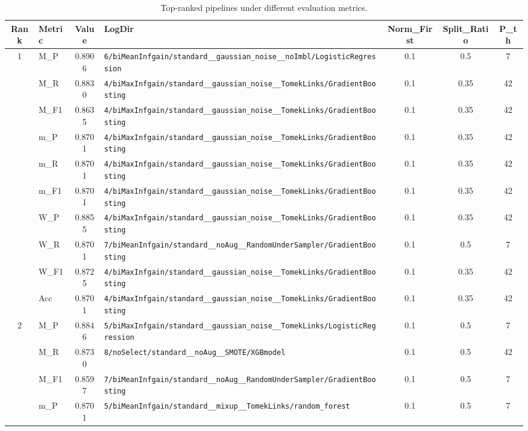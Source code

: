 \begin{table}[htbp]
\caption{Top-ranked pipelines under different evaluation metrics.}
\label{tab:rank_metric_vertical}
\centering
\small
\setlength{\tabcolsep}{4pt}
\begin{tabular}{|c|l|c|>{\ttfamily\footnotesize}p{7.2cm}|c|c|c|}
\hline
Rank & Metric & Value & LogDir & Norm\_First & Split\_Ratio & P\_th \\
\hline
\multirow{10}{*}{1} & M\_P & 0.8906 & \texttt{6/biMeanInfgain/standard\_\_gaussian\_noise\_\_noImbl/LogisticRegression} & 0.1 & 0.5  & 7 \\ 
 & M\_R & 0.8830 & \texttt{4/biMaxInfgain/standard\_\_gaussian\_noise\_\_TomekLinks/GradientBoosting} & 0.1 & 0.35  & 42 \\ 
 & M\_F1 & 0.8635 & \texttt{4/biMaxInfgain/standard\_\_gaussian\_noise\_\_TomekLinks/GradientBoosting} & 0.1 & 0.35  & 42 \\ 
 & m\_P & 0.8701 & \texttt{4/biMaxInfgain/standard\_\_gaussian\_noise\_\_TomekLinks/GradientBoosting} & 0.1 & 0.35  & 42 \\ 
 & m\_R & 0.8701 & \texttt{4/biMaxInfgain/standard\_\_gaussian\_noise\_\_TomekLinks/GradientBoosting} & 0.1 & 0.35  & 42 \\ 
 & m\_F1 & 0.8701 & \texttt{4/biMaxInfgain/standard\_\_gaussian\_noise\_\_TomekLinks/GradientBoosting} & 0.1 & 0.35  & 42 \\ 
 & W\_P & 0.8855 & \texttt{4/biMaxInfgain/standard\_\_gaussian\_noise\_\_TomekLinks/GradientBoosting} & 0.1 & 0.35  & 42 \\ 
 & W\_R & 0.8701 & \texttt{7/biMeanInfgain/standard\_\_noAug\_\_RandomUnderSampler/GradientBoosting} & 0.1 & 0.5  & 7 \\ 
 & W\_F1 & 0.8725 & \texttt{4/biMaxInfgain/standard\_\_gaussian\_noise\_\_TomekLinks/GradientBoosting} & 0.1 & 0.35  & 42 \\ 
 & Acc & 0.8701 & \texttt{4/biMaxInfgain/standard\_\_gaussian\_noise\_\_TomekLinks/GradientBoosting} & 0.1 & 0.35  & 42 \\ 
\hline
\multirow{10}{*}{2} & M\_P & 0.8846 & \texttt{5/biMaxInfgain/standard\_\_gaussian\_noise\_\_TomekLinks/LogisticRegression} & 0.1 & 0.5  & 7 \\ 
 & M\_R & 0.8730 & \texttt{8/noSelect/standard\_\_noAug\_\_SMOTE/XGBmodel} & 0.1 & 0.5  & 42 \\ 
 & M\_F1 & 0.8597 & \texttt{7/biMeanInfgain/standard\_\_noAug\_\_RandomUnderSampler/GradientBoosting} & 0.1 & 0.5  & 7 \\ 
 & m\_P & 0.8701 & \texttt{5/biMeanInfgain/standard\_\_mixup\_\_TomekLinks/random\_forest} & 0.1 & 0.5  & 7 \\ 

\end{tabular}
\end{table}
